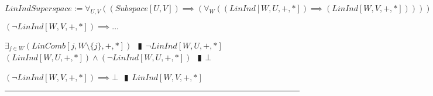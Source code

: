 \documentclass{book}
\newcommand{\abr}{:=}
\newcommand{\pipe}{$\phantom{(}\vrectangleblack\phantom{)}$}
\begin{document}
$LinIndSuperspace \abr \forall_{U, V}((Subspace[U, V]) \implies (\forall_{W}((LinInd[W, U, +, *]) \implies (LinInd[W, V, +, *]))))$
\begin{enumerate}
  \lit $(\lnot LinInd[W, V, +, *]) \implies \ldots$
  \begin{enumerate}
    \lit $\exists_{j \in W}(LinComb[j, W \setminus \{j\}, +, *])$ \pipe $\lnot LinInd[W, U, +, *]$
    \lit $(LinInd[W, U, +, *]) \land (\lnot LinInd[W, U, +, *])$ \pipe $\bot$
  \end{enumerate}
  \lit $(\lnot LinInd[W, V, +, *]) \implies \bot$ \pipe $LinInd[W, V, +, *]$
\end{enumerate} \vspace{.75mm} \hrule \vspace{.75mm} \ \\ 
\end{document}
